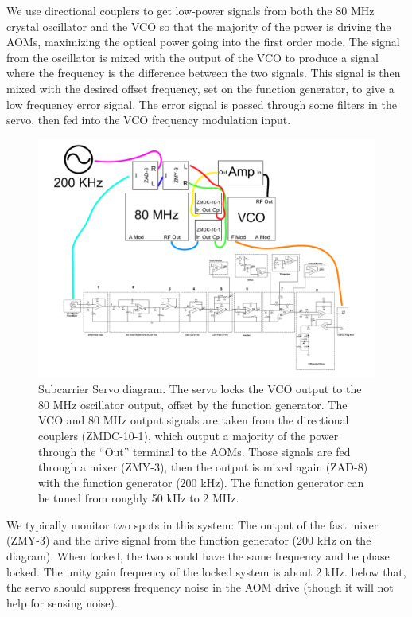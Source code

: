 We use directional couplers to get low-power signals from both the 80 MHz crystal oscillator and the VCO so that the majority of the power is driving the AOMs, maximizing the optical power going into the first order mode. 
The signal from the oscillator is mixed with the output of the VCO to produce a signal where the frequency is the difference between the two signals. 
This signal is then mixed with the desired offset frequency, set on the function generator, to give a low frequency error signal.
The error signal is passed through some filters in the servo, then fed into the VCO frequency modulation input.

\begin{figure}[htbp]%
\centering
\includegraphics[width=1.2\textwidth,angle=90]{figures/controls/SubcarrierServo}%
\caption[Subcarrier Servo]{Subcarrier Servo diagram. The servo locks the VCO output to the 80 MHz oscillator output, offset by the function generator. The VCO and 80 MHz output signals are taken from the directional couplers (ZMDC-10-1), which output a majority of the power through the ``Out'' terminal to the AOMs. Those signals are fed through a mixer (ZMY-3), then the output is mixed again (ZAD-8) with the function generator (200 kHz).
The function generator can be tuned from roughly 50 kHz to 2 MHz.}%
\label{fig:subcarrierservo}%
\end{figure}

We typically monitor two spots in this system: The output of the fast mixer (ZMY-3) and the drive signal from the function generator (200 kHz on the diagram). When locked, the two should have the same frequency and be phase locked. The unity gain frequency of the locked system is about 2 kHz. below that, the servo should suppress frequency noise in the AOM drive (though it will not help for sensing noise). 

